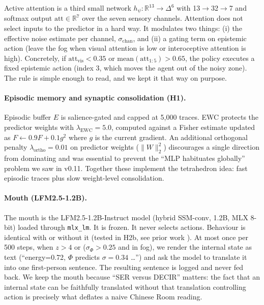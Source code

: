 \documentclass[11pt,a4paper]{article}
\begin{document}
Active attention is a third small network $h_\psi: \mathbb{R}^{13} \rightarrow \Delta^6$ with 13$\rightarrow$32$\rightarrow$7 and softmax output $\mathrm{att} \in \mathbb{R}^7$ over the seven sensory channels. Attention does not select inputs to the predictor in a hard way. It modulates two things: (i) the effective noise estimate per channel, $\sigma_{\mathrm{chan}}$, and (ii) a gating term on epistemic action (leave the fog when visual attention is low or interoceptive attention is high). Concretely, if $\mathrm{att}_{\mathrm{vis}} < 0.35$ or $\mathrm{mean}(\mathrm{att}_{1:5}) > 0.65$, the policy executes a fixed epistemic action (index 3, which moves the agent out of the noisy zone). The rule is simple enough to read, and we kept it that way on purpose.

\paragraph{Episodic memory and synaptic consolidation (H1).} Episodic buffer $E$ is salience-gated and capped at 5,000 traces. EWC \cite{kirkpatrick2017} protects the predictor weights with $\lambda_{\mathrm{EWC}}=5.0$, computed against a Fisher estimate updated as $F \leftarrow 0.9F + 0.1 g^2$ where $g$ is the current gradient. An additional orthogonal penalty $\lambda_{\mathrm{ortho}}=0.01$ on predictor weights ($\|W\|_2^2$) discourages a single direction from dominating and was essential to prevent the ``MLP habituates globally'' problem we saw in v0.11. Together these implement the tetrahedron idea: fast episodic traces plus slow weight-level consolidation.

\paragraph{Mouth (LFM2.5-1.2B).} The mouth is the LFM2.5-1.2B-Instruct model (hybrid SSM-conv, 1.2B, MLX 8-bit) loaded through \texttt{mlx\_lm}. It is frozen. It never selects actions. Behaviour is identical with or without it (tested in H2b, see prior work \cite{lfm2025}). At most once per 500 steps, when $z>4$ or ($\sigma_\Phi>0.25$ and in fog), we render the internal state as text (``energy=0.72, $\Phi$ predicts $\sigma=0.34$ \dots'') and ask the model to translate it into one first-person sentence. The resulting sentence is logged and never fed back. We keep the mouth because ``SER versus DECIR'' matters: the fact that an internal state can be faithfully translated without that translation controlling action is precisely what deflates a naive Chinese Room reading.
\end{document}

